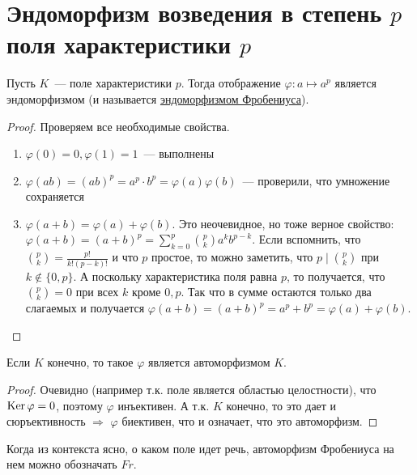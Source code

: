 \section{Эндоморфизм возведения в степень $p$ поля характеристики $p$}
\begin{lemma}
    Пусть $K$~--- поле характеристики $p$.
    Тогда отображение $\varphi: a \mapsto a^p$ является эндоморфизмом (и называется \underline{эндоморфизмом Фробениуса}).
\end{lemma}
\begin{proof}
    Проверяем все необходимые свойства.
    \begin{enumerate}
        \item $\varphi(0)=0, \varphi(1)=1$~--- выполнены
        \item $\varphi(ab) = (ab)^p = a^p \cdot b^p = \varphi(a)\varphi(b)$~--- проверили, что умножение сохраняется
        \item $\varphi(a+b)=\varphi(a)+\varphi(b)$.
        Это неочевидное, но тоже верное свойство: $\varphi(a+b)=(a+b)^p = \sum_{k=0}^p \binom{p}{k} a^k b^{p-k}$.
        Если вспомнить, что $\binom{p}{k} = \frac{p!}{k!(p-k)!}$ и что $p$ простое, то можно заметить, что $p \mid \binom{p}{k}$ при $k\notin \{0, p\}$.
        А поскольку характеристика поля равна $p$, то получается, что $\binom{p}{k}=0$ при всех $k$ кроме $0, p$.
        Так что в сумме остаются только два слагаемых и получается $\varphi(a+b)=(a+b)^p = a^p + b^p = \varphi(a) + \varphi(b)$.
    \end{enumerate}
\end{proof}
\follow Если $K$ конечно, то такое $\varphi$ является автоморфизмом $K$.
\begin{proof}
    Очевидно (например т.к. поле является областью целостности), что $\operatorname{Ker} \varphi = 0$, поэтому $\varphi$ инъективен.
    А т.к. $K$ конечно, то это дает и сюръективность $\Rightarrow$ $\varphi$ биективен, что и означает, что это автоморфизм.
\end{proof}
\notice Когда из контекста ясно, о каком поле идет речь, автоморфизм Фробениуса на нем можно обозначать $Fr$.
